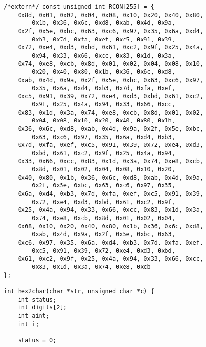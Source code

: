 \documentclass[a4paper]{report}
\begin{document}
\begin{lstlisting}
/*extern*/ const unsigned int RCON[255] = {
    0x8d, 0x01, 0x02, 0x04, 0x08, 0x10, 0x20, 0x40, 0x80,
        0x1b, 0x36, 0x6c, 0xd8, 0xab, 0x4d, 0x9a,
    0x2f, 0x5e, 0xbc, 0x63, 0xc6, 0x97, 0x35, 0x6a, 0xd4,
        0xb3, 0x7d, 0xfa, 0xef, 0xc5, 0x91, 0x39,
    0x72, 0xe4, 0xd3, 0xbd, 0x61, 0xc2, 0x9f, 0x25, 0x4a,
        0x94, 0x33, 0x66, 0xcc, 0x83, 0x1d, 0x3a,
    0x74, 0xe8, 0xcb, 0x8d, 0x01, 0x02, 0x04, 0x08, 0x10,
        0x20, 0x40, 0x80, 0x1b, 0x36, 0x6c, 0xd8,
    0xab, 0x4d, 0x9a, 0x2f, 0x5e, 0xbc, 0x63, 0xc6, 0x97,
        0x35, 0x6a, 0xd4, 0xb3, 0x7d, 0xfa, 0xef,
    0xc5, 0x91, 0x39, 0x72, 0xe4, 0xd3, 0xbd, 0x61, 0xc2,
        0x9f, 0x25, 0x4a, 0x94, 0x33, 0x66, 0xcc,
    0x83, 0x1d, 0x3a, 0x74, 0xe8, 0xcb, 0x8d, 0x01, 0x02,
        0x04, 0x08, 0x10, 0x20, 0x40, 0x80, 0x1b,
    0x36, 0x6c, 0xd8, 0xab, 0x4d, 0x9a, 0x2f, 0x5e, 0xbc,
        0x63, 0xc6, 0x97, 0x35, 0x6a, 0xd4, 0xb3,
    0x7d, 0xfa, 0xef, 0xc5, 0x91, 0x39, 0x72, 0xe4, 0xd3,
        0xbd, 0x61, 0xc2, 0x9f, 0x25, 0x4a, 0x94,
    0x33, 0x66, 0xcc, 0x83, 0x1d, 0x3a, 0x74, 0xe8, 0xcb,
        0x8d, 0x01, 0x02, 0x04, 0x08, 0x10, 0x20,
    0x40, 0x80, 0x1b, 0x36, 0x6c, 0xd8, 0xab, 0x4d, 0x9a,
        0x2f, 0x5e, 0xbc, 0x63, 0xc6, 0x97, 0x35,
    0x6a, 0xd4, 0xb3, 0x7d, 0xfa, 0xef, 0xc5, 0x91, 0x39,
        0x72, 0xe4, 0xd3, 0xbd, 0x61, 0xc2, 0x9f,
    0x25, 0x4a, 0x94, 0x33, 0x66, 0xcc, 0x83, 0x1d, 0x3a,
        0x74, 0xe8, 0xcb, 0x8d, 0x01, 0x02, 0x04,
    0x08, 0x10, 0x20, 0x40, 0x80, 0x1b, 0x36, 0x6c, 0xd8,
        0xab, 0x4d, 0x9a, 0x2f, 0x5e, 0xbc, 0x63,
    0xc6, 0x97, 0x35, 0x6a, 0xd4, 0xb3, 0x7d, 0xfa, 0xef,
        0xc5, 0x91, 0x39, 0x72, 0xe4, 0xd3, 0xbd,
    0x61, 0xc2, 0x9f, 0x25, 0x4a, 0x94, 0x33, 0x66, 0xcc,
        0x83, 0x1d, 0x3a, 0x74, 0xe8, 0xcb
};

int hex2char(char *str, unsigned char *c) {
    int status;
    int digits[2];
    int aint;
    int i;

    status = 0;


\end{lstlisting}
\end{document}

